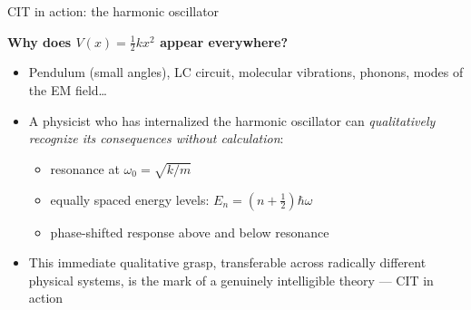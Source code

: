 \documentclass[fleqn]{beamer}
\begin{document}
\begin{frame}{CIT in action: the harmonic oscillator}

  \textbf{Why does $V(x) = \tfrac{1}{2}kx^2$ appear everywhere?}

  \begin{itemize}
  \item Pendulum (small angles), LC circuit, molecular vibrations,
    phonons, modes of the EM field\dots
  \item A physicist who has internalized the harmonic oscillator can
    \emph{qualitatively recognize its consequences without
    calculation}:
    \begin{itemize}
    \item resonance at $\omega_0 = \sqrt{k/m}$
    \item equally spaced energy levels:
      $E_n = (n+\tfrac{1}{2})\hbar\omega$
    \item phase-shifted response above and below resonance
    \end{itemize}
  \item This immediate qualitative grasp, transferable across
    radically different physical systems, is the mark of a genuinely
    intelligible theory --- CIT in action
  \end{itemize}

\end{frame}
\end{document}
